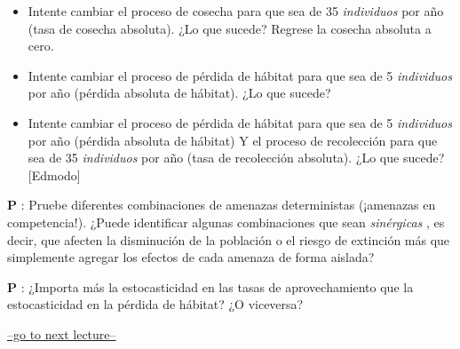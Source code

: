 \documentclass[
]{article}
\begin{document}
\begin{itemize}
\item
  Intente cambiar el proceso de cosecha para que sea de 35
  \emph{individuos } por año (tasa de cosecha absoluta). ¿Lo que sucede?
  Regrese la cosecha absoluta a cero.
\item
  Intente cambiar el proceso de pérdida de hábitat para que sea de 5
  \emph{individuos } por año (pérdida absoluta de hábitat). ¿Lo que
  sucede?
\item
  Intente cambiar el proceso de pérdida de hábitat para que sea de 5
  \emph{individuos } por año (pérdida absoluta de hábitat) Y el proceso
  de recolección para que sea de 35 \emph{individuos } por año (tasa de
  recolección absoluta). ¿Lo que sucede? {[}Edmodo{]}
\end{itemize}

\textbf{P }: Pruebe diferentes combinaciones de amenazas deterministas
(¡amenazas en competencia!). ¿Puede identificar algunas combinaciones
que sean \emph{sinérgicas }, es decir, que afecten la disminución de la
población o el riesgo de extinción más que simplemente agregar los
efectos de cada amenaza de forma aislada?

\textbf{P }: ¿Importa más la estocasticidad en las tasas de
aprovechamiento que la estocasticidad en la pérdida de hábitat? ¿O
viceversa?

\href{LECTURE12.html}{--go to next lecture--}
\end{document}
